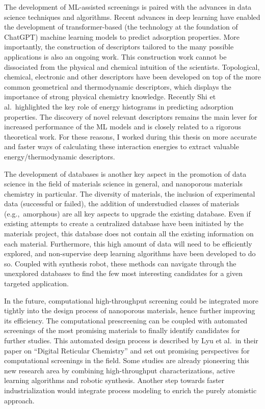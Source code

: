 \documentclass[main.tex]{subfiles}
\begin{document}
The development of ML-assisted screenings is paired with the advances in data science techniques and algorithms. Recent advances in deep learning have enabled the development of transformer-based (the technology at the foundation of ChatGPT) machine learning models to predict adsorption properties.\autocite{Kang_2023,Cao_2023} More importantly, the construction of descriptors tailored to the many possible applications is also an ongoing work. This construction work cannot be dissociated from the physical and chemical intuition of the scientists. Topological, chemical, electronic and other descriptors have been developed on top of the more common geometrical and thermodynamic descriptors, which displays the importance of strong physical chemistry knowledge. Recently Shi et al.\ highlighted the key role of energy histograms in predicting adsorption properties.\autocite{Shi_2023}
The discovery of novel relevant descriptors remains the main lever for increased performance of the ML models and is closely related to a rigorous theoretical work.
For these reasons, I worked during this thesis on more accurate and faster ways of calculating these interaction energies to extract valuable energy/thermodynamic descriptors.


The development of databases is another key aspect in the promotion of data science in the field of materials science in general, and nanoporous materials chemistry in particular. The diversity of materials, the inclusion of experimental data (successful or failed), the addition of understudied classes of materials (e.g.,\ amorphous) are all key aspects to upgrade the existing database. Even if existing attempts to create a centralized database have been initiated by the materials project,\autocite{MaterialsProject} this database does not contain all the existing information on each material. Furthermore, this high amount of data will need to be efficiently explored, and non-supervise deep learning algorithms have been developed to do so.\autocite{Park_2023} Coupled with synthesis robot, these methods can navigate through the unexplored databases to find the few most interesting candidates for a given targeted application.

In the future, computational high-throughput screening could be integrated more tightly into the design process of nanoporous materials, hence further improving its efficiency. The computational prescreening can be coupled with automated screenings of the most promising materials to finally identify candidates for further studies. This automated design process is described by Lyu et al.\ in their paper on ``Digital Reticular Chemistry'' and set out promising perspectives for computational screenings in the field.\autocite{Lyu_2020} Some studies are already pioneering this new research area by combining high-throughput characterizations, active learning algorithms and robotic synthesis.\autocite{Greenaway_2018,Moosavi_2019} Another step towards faster industrialization would integrate process modeling to enrich the purely atomistic approach.
\end{document}
